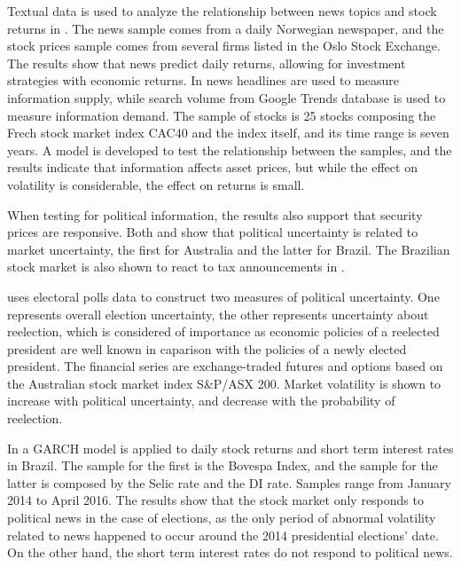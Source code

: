 \documentclass[cic,tc, english]{iiufrgs}
\begin{document}
    Textual data is used to analyze the relationship between news topics and stock returns in \citet{larsenthorsrud2017}. The news sample comes from a daily Norwegian newspaper, and the stock prices sample comes from several firms listed in the Oslo Stock Exchange. The results show that news predict daily returns, allowing for investment strategies with economic returns.
    In \citet{moussaetal2017} news headlines are used to measure information supply, while search volume from Google Trends database is used to measure information demand. The sample of stocks is 25 stocks composing the Frech stock market index CAC40 and the index itself, and its time range is seven years. A model is developed to test the relationship between the samples, and the results indicate that information affects asset prices, but while the effect on volatility is considerable, the effect on returns is small.

    When testing for political information, the results also support that security prices are responsive. Both \citet{smales2015} and \citet{marquessantos2016} show that political uncertainty is related to market uncertainty, the first for Australia and the latter for Brazil. The Brazilian stock market is also shown to react to tax announcements in \citet{gabrielribeiro2013}.

    \citet{smales2015} uses electoral polls data to construct two measures of political uncertainty. One represents overall election uncertainty, the other represents uncertainty about reelection, which is considered of importance as economic policies of a reelected president are well known in caparison with the policies of a newly elected president. The financial series are exchange-traded futures and options based on the Australian stock market index S\&P/ASX 200. Market volatility is shown to increase with political uncertainty, and decrease with the probability of reelection.
    
    In \citet{marquessantos2016} a GARCH model is applied to daily stock returns and short term interest rates in Brazil. The sample for the first is the Bovespa Index, and the sample for the latter is composed by the Selic rate and the DI rate. Samples range from January 2014 to April 2016. The results show that the stock market only responds to political news in the case of elections, as the only period of abnormal volatility related to news happened to occur around the 2014 presidential elections' date. On the other hand, the short term interest rates do not respond to political news.
    
\end{document}
